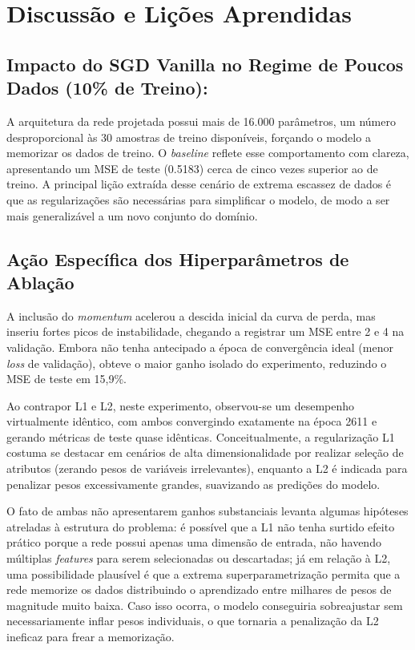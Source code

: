 \documentclass[11pt,a4paper]{article}
\begin{document}
\section{Discussão e Lições Aprendidas}

\subsection{Impacto do SGD Vanilla no Regime de Poucos Dados (10\% de Treino):}
A arquitetura da rede projetada possui mais de 16.000 parâmetros, um número desproporcional às 30 amostras de treino disponíveis, forçando o modelo a memorizar os dados de treino. O \textit{baseline} reflete esse comportamento com clareza, apresentando um MSE de teste (0.5183) cerca de cinco vezes superior ao de treino. A principal lição extraída desse cenário de extrema escassez de dados é que as regularizações são necessárias para simplificar o modelo, de modo a ser mais generalizável a um novo conjunto do domínio. 

\subsection{Ação Específica dos Hiperparâmetros de Ablação}

A inclusão do \textit{momentum} acelerou a descida inicial da curva de perda, mas inseriu fortes picos de instabilidade, chegando a registrar um MSE entre 2 e 4 na validação. Embora não tenha antecipado a época de convergência ideal (menor \emph{loss} de validação), obteve o maior ganho isolado do experimento, reduzindo o MSE de teste em 15,9\%.

Ao contrapor L1 e L2, neste experimento, observou-se um desempenho virtualmente idêntico, com ambos convergindo exatamente na época 2611 e gerando métricas de teste quase idênticas. Conceitualmente, a regularização L1 costuma se destacar em cenários de alta dimensionalidade por realizar seleção de atributos (zerando pesos de variáveis irrelevantes), enquanto a L2 é indicada para penalizar pesos excessivamente grandes, suavizando as predições do modelo. 

O fato de ambas não apresentarem ganhos substanciais levanta algumas hipóteses atreladas à estrutura do problema: é possível que a L1 não tenha surtido efeito prático porque a rede possui apenas uma dimensão de entrada, não havendo múltiplas \textit{features} para serem selecionadas ou descartadas; já em relação à L2, uma possibilidade plausível é que a extrema superparametrização permita que a rede memorize os dados distribuindo o aprendizado entre milhares de pesos de magnitude muito baixa. Caso isso ocorra, o modelo conseguiria sobreajustar sem necessariamente inflar pesos individuais, o que tornaria a penalização da L2 ineficaz para frear a memorização.
\end{document}
